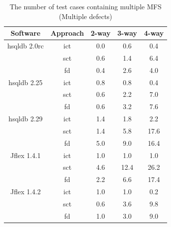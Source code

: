 \documentclass[10pt,journal,compsoc]{IEEEtran}
\begin{document}
{\begin{table}[ht]
\caption{The number of test cases containing multiple MFS (Multiple defects)}
\label{multiple_tdefects_tests_multiple}
\centering
\begin{tabular}{|c|c|c|c|c|} \hline
Software&  Approach & 2-way & 3-way & 4-way\\ \hline
hsqldb 2.0rc	&ict	&0.0	&0.6	&0.4	\\
	&sct	&0.6	&1.4	&6.4	\\
	&fd	&0.4	&2.6	&4.0	\\ \hline
hsqldb 2.25	&ict	&0.8	&0.8	&0.4	\\
	&sct	&0.6	&2.2	&7.0	\\
	&fd	&0.6	&3.2	&7.6	\\ \hline
hsqldb 2.29	&ict	&1.4	&1.8	&2.2	\\
	&sct	&1.4	&5.8	&17.6	\\
	&fd	&5.0	&9.0	&16.4	\\ \hline
Jflex 1.4.1	&ict	&1.0	&1.0	&1.0	\\
	&sct	&4.6	&12.4	&26.2	\\
	&fd	&2.2	&6.6	&17.4	\\\hline
Jflex 1.4.2	&ict	&1.0	&1.0	&0.2	\\
	&sct	&0.6	&3.6	&9.8	\\
	&fd	&1.0	&3.0	&9.0	\\\hline
\end{tabular}
\end{table}


}
\end{document}
